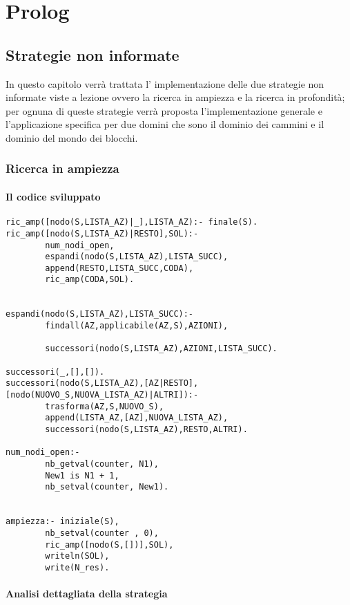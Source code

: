 \part{Prolog}

\chapter{Strategie non informate}
In questo capitolo verrà trattata l' implementazione delle due strategie non informate viste a lezione ovvero la ricerca in ampiezza e la ricerca in profondità; per ognuna di queste strategie verrà proposta l'implementazione generale e l'applicazione specifica per due domini che sono il dominio dei cammini e il dominio del mondo dei blocchi.

\section{Ricerca in ampiezza}

\subsection{Il codice sviluppato}

\begin{lstlisting}
ric_amp([nodo(S,LISTA_AZ)|_],LISTA_AZ):- finale(S).
ric_amp([nodo(S,LISTA_AZ)|RESTO],SOL):-
        num_nodi_open,
        espandi(nodo(S,LISTA_AZ),LISTA_SUCC),
        append(RESTO,LISTA_SUCC,CODA),
        ric_amp(CODA,SOL).


espandi(nodo(S,LISTA_AZ),LISTA_SUCC):-
        findall(AZ,applicabile(AZ,S),AZIONI),

        successori(nodo(S,LISTA_AZ),AZIONI,LISTA_SUCC).

successori(_,[],[]).
successori(nodo(S,LISTA_AZ),[AZ|RESTO],[nodo(NUOVO_S,NUOVA_LISTA_AZ)|ALTRI]):-
        trasforma(AZ,S,NUOVO_S),
        append(LISTA_AZ,[AZ],NUOVA_LISTA_AZ),
        successori(nodo(S,LISTA_AZ),RESTO,ALTRI).

num_nodi_open:-
        nb_getval(counter, N1),
        New1 is N1 + 1,
        nb_setval(counter, New1).


ampiezza:- iniziale(S),
        nb_setval(counter , 0),
        ric_amp([nodo(S,[])],SOL),
        writeln(SOL),
        write(N_res).
\end{lstlisting}

\subsection{Analisi dettagliata della strategia}

